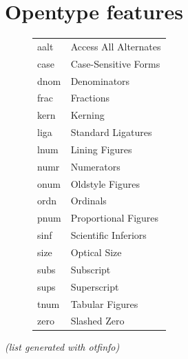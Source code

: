 \documentclass[11pt,a4paper,english]{article}
\begin{document}
\newpage
\section{Opentype features}
\label{sec:otfinfo}

\begin{figure}[ht]
	\centering
	\begin{tabular}{>{\ttfamily}l l}
		aalt & Access All Alternates \\
		case & Case-Sensitive Forms \\
		dnom & Denominators \\
		frac & Fractions \\
		kern & Kerning \\
		liga & Standard Ligatures \\
		lnum & Lining Figures \\
		numr & Numerators \\
		onum & Oldstyle Figures \\
		ordn & Ordinals \\
		pnum & Proportional Figures \\
		sinf & Scientific Inferiors \\
		size & Optical Size \\
		subs & Subscript \\
		sups & Superscript \\
		tnum & Tabular Figures \\
		zero & Slashed Zero \\
	\end{tabular}
\end{figure}
\textit{(list generated with otfinfo)}
\end{document}
